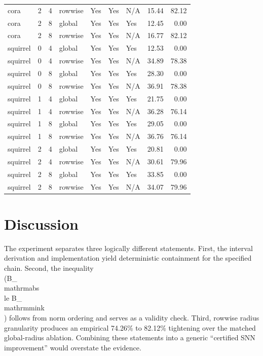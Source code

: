 \documentclass{article}
\begin{document}
{\begin{table}[ht]
{\begin{tabular}{lrrllllrr}
cora & 2 & 4 & rowwise & Yes & Yes & N/A & 15.44 & 82.12 \\
cora & 2 & 8 & global & Yes & Yes & Yes & 12.45 & 0.00 \\
cora & 2 & 8 & rowwise & Yes & Yes & N/A & 16.77 & 82.12 \\
squirrel & 0 & 4 & global & Yes & Yes & Yes & 12.53 & 0.00 \\
squirrel & 0 & 4 & rowwise & Yes & Yes & N/A & 34.89 & 78.38 \\
squirrel & 0 & 8 & global & Yes & Yes & Yes & 28.30 & 0.00 \\
squirrel & 0 & 8 & rowwise & Yes & Yes & N/A & 36.91 & 78.38 \\
squirrel & 1 & 4 & global & Yes & Yes & Yes & 21.75 & 0.00 \\
squirrel & 1 & 4 & rowwise & Yes & Yes & N/A & 36.28 & 76.14 \\
squirrel & 1 & 8 & global & Yes & Yes & Yes & 29.05 & 0.00 \\
squirrel & 1 & 8 & rowwise & Yes & Yes & N/A & 36.76 & 76.14 \\
squirrel & 2 & 4 & global & Yes & Yes & Yes & 20.81 & 0.00 \\
squirrel & 2 & 4 & rowwise & Yes & Yes & N/A & 30.61 & 79.96 \\
squirrel & 2 & 8 & global & Yes & Yes & Yes & 33.85 & 0.00 \\
squirrel & 2 & 8 & rowwise & Yes & Yes & N/A & 34.07 & 79.96 \\
\bottomrule
\end{tabular}
}
\end{table}

\section{Discussion}

\label{sec:discussion}

The experiment separates three logically different statements. First, the interval derivation and implementation yield deterministic containment for the specified chain. Second, the inequality \\(B_{\\mathrm{abs}}\\le B_{\\mathrm{mink}}\\) follows from norm ordering and serves as a validity check. Third, rowwise radius granularity produces an empirical 74.26\% to 82.12\% tightening over the matched global-radius ablation. Combining these statements into a generic ``certified SNN improvement'' would overstate the evidence.

}
\end{document}
